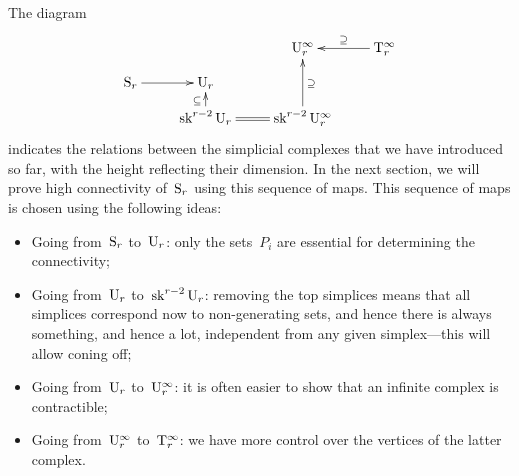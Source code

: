 The diagram 
\[
\xymatrix@R=10pt{
&&\rmU_r^\infty&\rmT_r^\infty\ar[l]_{\supseteq}\\
\rmS_r\ar[r]&\rmU_r\\
&\sk^{r-2}\rmU_r\ar[u]^\subseteq\ar@{=}[r]&\sk^{r-2}\rmU_r^\infty\ar[uu]_\supseteq}
\]
indicates the relations between the simplicial complexes that we have introduced so far, with the height reflecting their dimension.
In the next section, we will prove high connectivity of~$\mathrm{S}_r$ using this sequence of maps. 
This sequence of maps is chosen using the following ideas:
\begin{itemize}[noitemsep,topsep=0pt]
\item Going from~$\mathrm{S}_r$ to~$\mathrm{U}_r$: only the sets~$P_i$ are essential for determining the connectivity; 
\item Going from~$\mathrm{U}_r$ to~$\operatorname{sk}^{r-2}\mathrm{U}_r$: removing the top simplices means that all simplices correspond now to non-generating sets, and hence there is always something, and hence a lot, independent from any given simplex---this will allow coning off; 
\item Going from~$\mathrm{U}_r$ to~$\mathrm{U}_r^\infty$: it is often easier to show that an infinite complex is contractible; 
\item Going from~$\mathrm{U}_r^\infty$ to~$\mathrm{T}_r^\infty$: we have more control over the vertices of the latter complex. 
\end{itemize}

